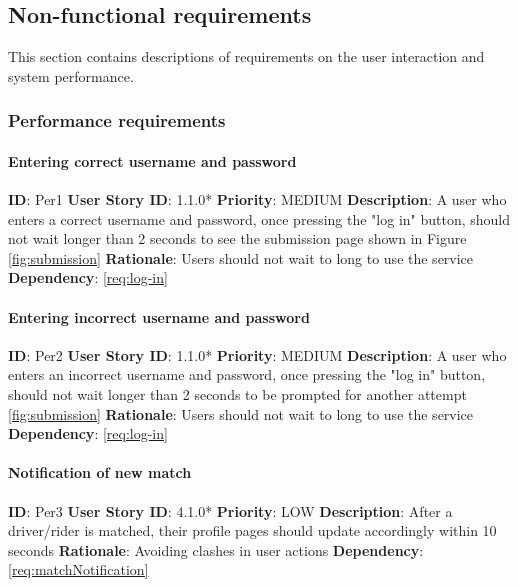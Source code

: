 \documentclass{article}
\begin{document}
\subsection{Non-functional requirements}
This section contains descriptions of requirements on the user interaction and system performance.

\subsubsection{Performance requirements}

\paragraph{Entering correct username and password}\label{req:}
\textbf{ID}: Per1\newline
\textbf{User Story ID}: 1.1.0*\newline
\textbf{Priority}: MEDIUM\newline
\textbf{Description}: A user who enters a correct username and password, once pressing the "log in" button, should not wait longer than 2 seconds to see the submission page shown in Figure \ref{fig:submission}\newline
\textbf{Rationale}: Users should not wait to long to use the service\newline
\textbf{Dependency}: \ref{req:log-in} \newline

\paragraph{Entering incorrect username and password}\label{req:}
\textbf{ID}: Per2\newline
\textbf{User Story ID}: 1.1.0*\newline
\textbf{Priority}: MEDIUM\newline
\textbf{Description}: A user who enters an incorrect username and password, once pressing the "log in" button, should not wait longer than 2 seconds to be prompted for another attempt \ref{fig:submission}\newline
\textbf{Rationale}: Users should not wait to long to use the service\newline
\textbf{Dependency}: \ref{req:log-in} \newline

\paragraph{Notification of new match}\label{req:}
\textbf{ID}: Per3\newline
\textbf{User Story ID}: 4.1.0*\newline
\textbf{Priority}: LOW\newline
\textbf{Description}: After a driver/rider is matched, their profile pages should update accordingly within 10 seconds\newline
\textbf{Rationale}: Avoiding clashes in user actions\newline
\textbf{Dependency}: \ref{req:matchNotification} \newline
\end{document}
